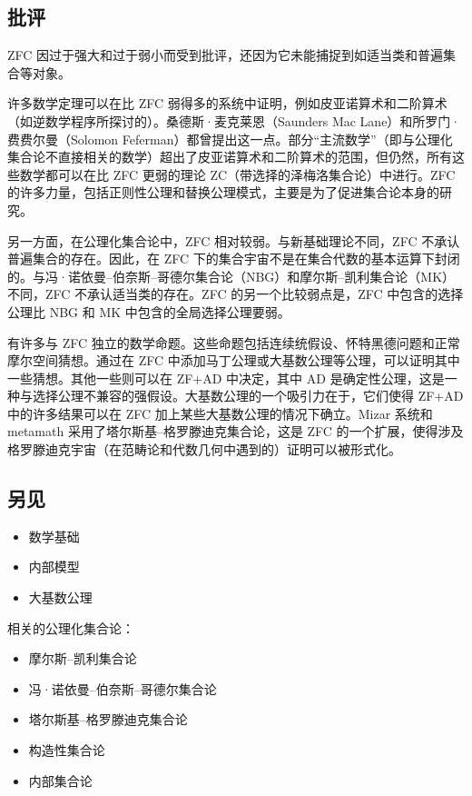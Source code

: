 \subsection{批评}  
ZFC 因过于强大和过于弱小而受到批评，还因为它未能捕捉到如适当类和普遍集合等对象。

许多数学定理可以在比 ZFC 弱得多的系统中证明，例如皮亚诺算术和二阶算术（如逆数学程序所探讨的）。桑德斯·麦克莱恩（Saunders Mac Lane）和所罗门·费费尔曼（Solomon Feferman）都曾提出这一点。部分“主流数学”（即与公理化集合论不直接相关的数学）超出了皮亚诺算术和二阶算术的范围，但仍然，所有这些数学都可以在比 ZFC 更弱的理论 ZC（带选择的泽梅洛集合论）中进行。ZFC 的许多力量，包括正则性公理和替换公理模式，主要是为了促进集合论本身的研究。

另一方面，在公理化集合论中，ZFC 相对较弱。与新基础理论不同，ZFC 不承认普遍集合的存在。因此，在 ZFC 下的集合宇宙不是在集合代数的基本运算下封闭的。与冯·诺依曼–伯奈斯–哥德尔集合论（NBG）和摩尔斯–凯利集合论（MK）不同，ZFC 不承认适当类的存在。ZFC 的另一个比较弱点是，ZFC 中包含的选择公理比 NBG 和 MK 中包含的全局选择公理要弱。

有许多与 ZFC 独立的数学命题。这些命题包括连续统假设、怀特黑德问题和正常摩尔空间猜想。通过在 ZFC 中添加马丁公理或大基数公理等公理，可以证明其中一些猜想。其他一些则可以在 ZF+AD 中决定，其中 AD 是确定性公理，这是一种与选择公理不兼容的强假设。大基数公理的一个吸引力在于，它们使得 ZF+AD 中的许多结果可以在 ZFC 加上某些大基数公理的情况下确立。Mizar 系统和 metamath 采用了塔尔斯基–格罗滕迪克集合论，这是 ZFC 的一个扩展，使得涉及格罗滕迪克宇宙（在范畴论和代数几何中遇到的）证明可以被形式化。
\subsection{另见}  
\begin{itemize}
\item 数学基础  
\item 内部模型  
\item 大基数公理
\end{itemize}  
相关的公理化集合论：
\begin{itemize}
\item 摩尔斯–凯利集合论  
\item 冯·诺依曼–伯奈斯–哥德尔集合论  
\item 塔尔斯基–格罗滕迪克集合论  
\item 构造性集合论  
\item 内部集合论
\end{itemize}
